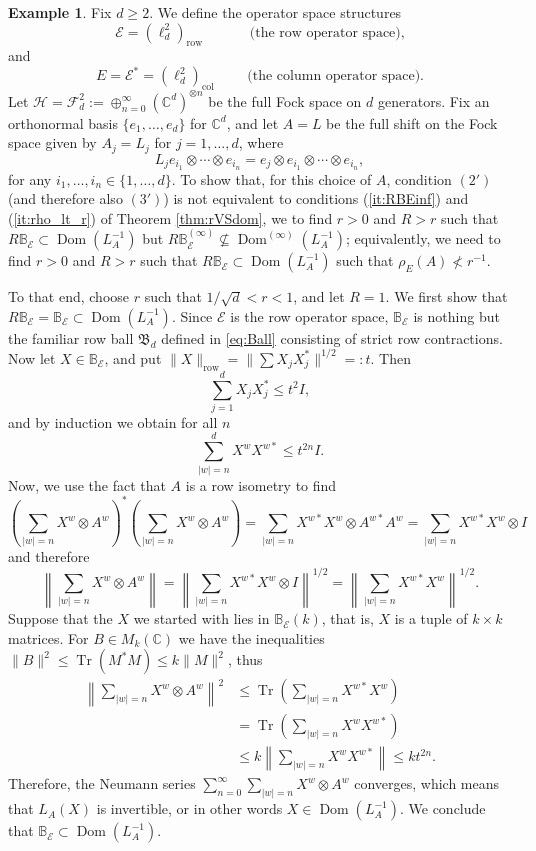 \documentclass[12pt]{amsart}
\numberwithin{equation}{section}
\theoremstyle{definition}
\newtheorem{example}[theorem]{Example}
\newcommand{\be}{\begin{equation}}
\newcommand{\ee}{\end{equation}}
\newcommand{\cE}{\mathcal{E}}
\newcommand{\cF}{\mathcal{F}}
\newcommand{\cH}{\mathcal{H}}
\newcommand{\bB}{\mathbb{B}}
\newcommand{\bC}{\mathbb{C}}
\newcommand{\Tr}{\operatorname{Tr}}
\newcommand{\fB}{{\mathfrak{B}}}
\newcommand{\dom}{\operatorname{Dom}}
\begin{document}
\begin{example}\label{ex:not_persist}
    Fix $d \geq 2$. We  define the operator space structures
    \[
    \cE = \left(\ell^2_d\right)_{\operatorname{row}} \quad \quad \quad \textrm{ (the row operator space),}
    \]
    and 
    \[
    E = \cE^* = \left(\ell^2_d\right)_{\operatorname{col}} \quad \quad \textrm{ (the column operator space).}
    \]
    Let $\cH = \cF_d^2 := \oplus_{n=0}^\infty (\bC^d)^{\otimes n}$ be the full Fock space on $d$ generators. 
    Fix an orthonormal basis $\{e_1, \ldots, e_d\}$ for $\bC^d$, and let $A = L$ be the full shift on the Fock space given by $A_j = L_j$ for $j=1, \ldots, d$, where
    \[
    L_j e_{i_1} \otimes \cdots \otimes e_{i_n} = 
    e_j \otimes e_{i_1} \otimes \cdots \otimes e_{i_n}, 
    \]
    for any $i_1, \ldots, i_n \in \{1, \ldots, d\}$. 
    To show that, for this choice of $A$, condition $(2')$ (and therefore  also $(3')$) is not equivalent to conditions (\ref{it:RBEinf}) and (\ref{it:rho_lt_r}) of Theorem \ref{thm:rVSdom}, we to find $r>0$ and $R>r$ such that $R\bB_\cE \subset \dom(L^{-1}_A)$ but $R\bB^{(\infty)}_\cE \nsubseteq \dom^{(\infty)}(L^{-1}_A)$; equivalently, we need to find $r>0$ and $R>r$ such that $R\bB_\cE \subset \dom(L^{-1}_A)$ such that $\rho_E(A) \nless r^{-1}$. 

    To that end, choose $r$ such that ${1}/{\sqrt{d}} < r < 1$, and let $R=1$. We first show that $R\bB_\cE = \bB_\cE \subset \dom(L^{-1}_A)$. 
    Since $\cE$ is the row operator space, $\bB_\cE$ is nothing but the familiar row ball $\fB_d$ defined in \eqref{eq:Ball} consisting of strict row contractions. 
    Now let $X\in \bB_\cE$, and put $\|X\|_{\operatorname{row}} = \|\sum X_j X_j^*\|^{1/2} =: t$. 
    Then 
    \[
    \sum_{j=1}^d X_j X_j^* \leq t^2 I, 
    \]
    and by induction we obtain for all $n$ 
    \[
    \sum_{|w|=n}^d X^w X^{w*} \leq t^{2n} I. 
    \]
    Now, we use the fact that $A$ is a row isometry to find
    \[
    \left(\sum_{|w|=n} X^w \otimes A^w\right)^*\left(\sum_{|w|=n} X^w \otimes A^w\right)  = \sum_{|w|=n} X^{w*}X^w \otimes A^{w*} A^w = \sum_{|w|=n} X^{w*}X^w \otimes I 
    \]
    and therefore
    \be\label{eq:sumwxa}
    \left\|\sum_{|w|=n} X^w \otimes A^w \right\| = \left\| \sum_{|w|=n} X^{w*}X^w \otimes I \right\|^{1/2} = \left\| \sum_{|w|=n} X^{w*}X^w \right\|^{1/2}. 
    \ee
    Suppose that the $X$ we started with lies in $\bB_\cE(k)$, that is, $X$ is a tuple of $ k \times k$ matrices. 
    For $B \in M_k(\bC)$ we have the inequalities $\|B\|^2 \leq \Tr(M^*M) \leq k \|M\|^2$, thus
    \begin{align*}
    \left\|\sum_{|w|=n} X^w \otimes A^w \right\|^2
    & \leq \Tr\left( \sum_{|w|=n} X^{w*}X^w \right) \\
    &= \Tr\left( \sum_{|w|=n} X^wX^{w*} \right) \\
    & \leq k \left\|\sum_{|w|=n} X^wX^{w*} \right\| \leq k t^{2n}. 
    \end{align*}
    Therefore, the Neumann series $\sum_{n=0}^\infty \sum_{|w|=n} X^w \otimes A^w$ converges, which means that $L_A(X)$ is invertible, or in other words $X \in \dom(L_A^{-1})$. 
    We conclude that $\bB_\cE \subset \dom(L^{-1}_A)$. 


\end{example}
\end{document}

